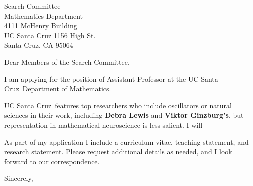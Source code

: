 \documentclass[11pt,a4paper]{letter}
\begin{document}

\def\School{UC Santa Cruz}

\begin{letter}
{Search Committee\\
Mathematics Department\\
4111 McHenry Building\\
UC Santa Cruz 1156 High St.\\
Santa Cruz, CA 95064}


\opening{Dear Members of the Search Committee,}

I am applying for the position of Assistant Professor at the \School~Department of Mathematics. 



\School~features top researchers who include oscillators or natural sciences in their work, including \textbf{Debra Lewis} and \textbf{Viktor Ginzburg's}, but representation in mathematical neuroscience is less salient. I will 



As part of my application I include a curriculum vitae, teaching statement, and research statement. Please request additional details as needed, and I look forward to our correspondence.

\closing{Sincerely,}
\end{letter}
\end{document}
